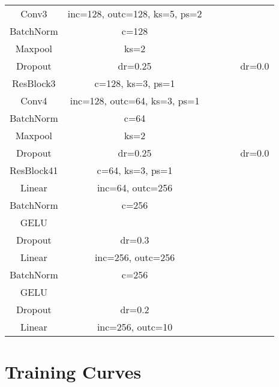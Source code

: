 \documentclass[a4 paper,12pt]{article}
\theoremstyle{definitionstyle}
\begin{document}
\begin{longtable}{|c|c|c|c|c|c|}
    \hline
    Conv3 & inc=128, outc=128, ks=5, ps=2 & & & & \\
    BatchNorm & c=128 & & & & \\
    Maxpool & ks=2 & & & & \\
    Dropout & dr=0.25 & & & & dr=0.0\\
    \hline
    ResBlock3 & c=128, ks=3, ps=1 & & & & \\
    \hline
    Conv4 & inc=128, outc=64, ks=3, ps=1 & & & & \\
    BatchNorm & c=64 & & & & \\
    Maxpool & ks=2 & & & & \\
    Dropout & dr=0.25 & & & & dr=0.0\\
    \hline
    ResBlock41 & c=64, ks=3, ps=1 & & & & \\
    \hline
    Linear & inc=64, outc=256 & & & & \\
    BatchNorm & c=256 & & & & \\
    GELU & & & & & \\
    Dropout & dr=0.3 & & & & \\
    Linear & inc=256, outc=256 & & & & \\
    BatchNorm & c=256 & & & & \\
    GELU & & & & & \\
    Dropout & dr=0.2 & & & & \\
    Linear & inc=256, outc=10 & & & & \\      
    \hline
\end{longtable}
\section*{Training Curves}
\end{document}

